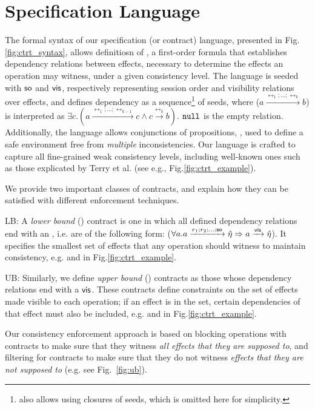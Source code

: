 \section {Specification Language} 
\label{sec:ctrt_language}
The formal syntax of our specification (or contract) language, presented in
Fig.\ref{fig:ctrt_syntax}, allows definitiosn of
\propS{}, a first-order formula
that establishes dependency relations between effects,
necessary to determine the effects an operation may witness, under
a given consistency level.
The language is seeded with ${\textsf{so}}$ and ${\normalfont \textsf{vis}}$, respectively representing session
order and visibility relations over effects, 
and defines dependency \relationS{} as a sequence\footnote{\tool also allows
using closures of seeds, which is omitted here for
simplicity.} of seeds,  
where 
({\footnotesize $a \xrightarrow{\rel_1;...;\rel_k} b$})
is interpreted as 
{\footnotesize$\exists c. (a
\xrightarrow{\rel_1;...;\rel_{k-1}} c
\wedge c \xrightarrow {\rel_k} b)$}.
$\mathtt{null}{}$ is the empty relation.
Additionally, the language allows conjunctions of propositions, \specS{},
used to define a safe environment
free from \emph{multiple} inconsistencies. 
Our language is crafted to capture all fine-grained weak consistency
levels, including well-known ones such as those explicated by Terry et al. \cite{terry}
(see e.g., Fig.\ref{fig:ctrt_example}).


%
We provide two important classes of 
contracts, and explain how they can be
satisfied with different enforcement techniques.
\begin{description}
\item {\textsf LB}: A \emph{lower bound} (\LB{}) contract is one in
  which all defined dependency relations end with an \soZ, i.e. are of
  the following form: ({\footnotesize $\forall a. a
    \xrightarrow{r_1;r_2;...;{\textsf{so}}} \hat{\eta} \Rightarrow a
    \xrightarrow{{\normalfont \textsf{vis}}} \hat{\eta}$}). It specifies the smallest set
  of effects that any operation should witness to maintain
  consistency, e.g.  \rmwCTRT{} and \mrCTRT{} in
  Fig.\ref{fig:ctrt_example}.

\item {\textsf UB}: Similarly, we define \emph{upper bound} (\UB{})
  contracts as those whose dependency relations end with a ${\normalfont \textsf{vis}}$.
  These contracts define constraints on the set of effects made
  visible to each operation; if an effect is in the set, certain
  dependencies of that effect must also be included, e.g.  \visCTRT{}
  and \mwCTRT{} in Fig.\ref{fig:ctrt_example}.
\end{description}
Our consistency enforcement approach is based on blocking operations
with \LB{} contracts to make sure that they witness \emph{all effects
  that they are supposed to}, and filtering for \UB{} contracts to
make sure that they do not witness \emph{effects that they are not
  supposed to} (e.g. see Fig.~\ref{fig:ub}).  



  
